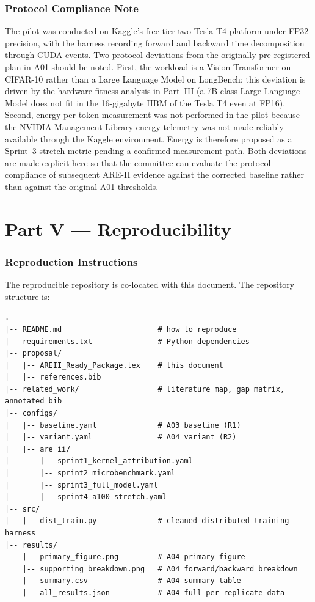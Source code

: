 \documentclass[11pt]{article}
\begin{document}
\section{Protocol Compliance Note}

The pilot was conducted on Kaggle's free-tier two-Tesla-T4 platform under FP32 precision, with the harness recording forward and backward time decomposition through CUDA events. Two protocol deviations from the originally pre-registered plan in A01 should be noted. First, the workload is a Vision Transformer on CIFAR-10 rather than a Large Language Model on LongBench; this deviation is driven by the hardware-fitness analysis in Part~III (a 7B-class Large Language Model does not fit in the 16-gigabyte HBM of the Tesla T4 even at FP16). Second, energy-per-token measurement was not performed in the pilot because the NVIDIA Management Library energy telemetry was not made reliably available through the Kaggle environment. Energy is therefore proposed as a Sprint~3 stretch metric pending a confirmed measurement path. Both deviations are made explicit here so that the committee can evaluate the protocol compliance of subsequent ARE-II evidence against the corrected baseline rather than against the original A01 thresholds.

\newpage

\part*{Part V --- Reproducibility}

\section{Reproduction Instructions}

The reproducible repository is co-located with this document. The repository structure is:

\begin{small}
\begin{verbatim}
.
|-- README.md                      # how to reproduce
|-- requirements.txt               # Python dependencies
|-- proposal/
|   |-- AREII_Ready_Package.tex    # this document
|   |-- references.bib
|-- related_work/                  # literature map, gap matrix, annotated bib
|-- configs/
|   |-- baseline.yaml              # A03 baseline (R1)
|   |-- variant.yaml               # A04 variant (R2)
|   |-- are_ii/
|       |-- sprint1_kernel_attribution.yaml
|       |-- sprint2_microbenchmark.yaml
|       |-- sprint3_full_model.yaml
|       |-- sprint4_a100_stretch.yaml
|-- src/
|   |-- dist_train.py              # cleaned distributed-training harness
|-- results/
    |-- primary_figure.png         # A04 primary figure
    |-- supporting_breakdown.png   # A04 forward/backward breakdown
    |-- summary.csv                # A04 summary table
    |-- all_results.json           # A04 full per-replicate data
\end{verbatim}
\end{small}
\end{document}
